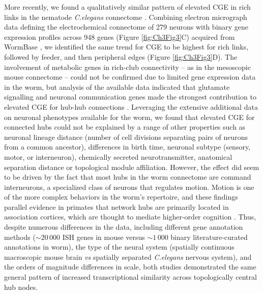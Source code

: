 More recently, we found a qualitatively similar pattern of elevated CGE in rich links in the nematode \textit{C.elegans} connectome \citep{Arnatkeviciute2018}.
Combining electron micrograph data defining the electrochemical connectome of 279 neurons \citep{Varshney2011} with binary gene expression profiles across 948 genes (Figure \ref{fig:Ch3Fig3}C) acquired from WormBase \citep{Harris2010}, we identified the same trend for CGE to be highest for rich links, followed by feeder, and then peripheral edges (Figure \ref{fig:Ch3Fig3}D).
The involvement of metabolic genes in rich-club connectivity -- as in the mesoscopic mouse connectome \citep{Fulcher2016} -- could not be confirmed due to limited gene expression data in the worm, but analysis of the available data indicated that glutamate signalling and neuronal communication genes made the strongest contribution to elevated CGE for hub-hub connections \citep{Arnatkeviciute2018}.
Leveraging the extensive additional data on neuronal phenotypes available for the worm, we found that elevated CGE for connected hubs could not be explained by a range of other properties such as neuronal lineage distance (number of cell divisions separating pairs of neurons from a common ancestor), differences in birth time, neuronal subtype (sensory, motor, or interneuron), chemically secreted neurotransmitter, anatomical separation distance or topological module affiliation. However, the effect did seem to be driven by the fact that most hubs in the worm connectome are command interneurons, a specialized class of neurons that regulates motion. Motion is one of the more complex behaviors in the worm’s repertoire, and these findings parallel evidence in primates that network hubs are primarily located in association cortices, which are thought to mediate higher-order cognition \citep{Achard2006,Sporns2007}.
Thus, despite numerous differences in the data, including different gene annotation methods ($\sim20\,000$ ISH genes in mouse versus $\sim1\,000$ binary literature-curated annotations in worm), the type of the neural system (spatially continuous macroscopic mouse brain \textit{vs} spatially separated \textit{C.elegans} nervous system), and the orders of magnitude differences in scale, both studies demonstrated the same general pattern of increased transcriptional similarity across topologically central hub nodes.

